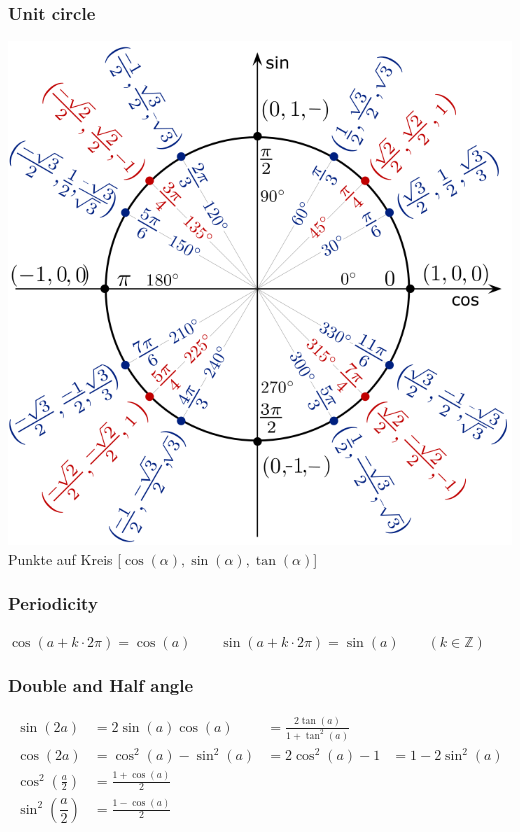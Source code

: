 \subsubsection{Unit circle}
\begin{center}
	\includegraphics[width=0.8\columnwidth]{Images/einheitskreis}\\
	Punkte auf Kreis [$\cos(\alpha), \sin(\alpha), \tan(\alpha)$]
\end{center}

\subsubsection{Periodicity}
$\cos(a+k\cdot2\pi)=\cos(a) \qquad \sin(a+k\cdot2\pi)=\sin(a) \qquad
(k \in \mathbb{Z})$

\subsubsection{Double and Half angle}	
\begin{align*}
	\sin(2a) &=2\sin(a)\cos(a) &= \frac{2\tan(a)}{1 +\tan^2(a)}\\
	\cos(2a) &=\cos^2(a)-\sin^2(a) &= 2\cos^2(a)-1 &= 1-2\sin^2(a)\\
	\cos^2 \left(\frac{a}{2}\right) &=\frac{1+\cos(a)}{2} \\
	\sin^2 \left(\dfrac{a}{2}\right)&=\frac{1-\cos(a)}{2}
\end{align*}


